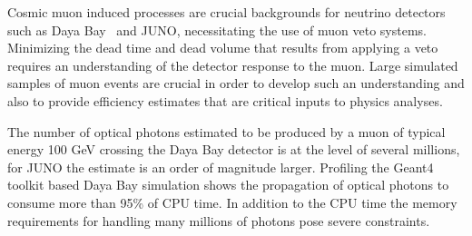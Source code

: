 \documentclass[a4paper]{jpconf}
\begin{document}

Cosmic muon induced processes are crucial backgrounds for neutrino
detectors such as Daya Bay~\cite{dyb} and JUNO\cite{juno}, 
necessitating the use of muon veto systems.
Minimizing the dead time and dead volume that results from applying 
a veto requires an understanding of the detector response to the muon.
Large simulated samples of muon events are crucial in order to 
develop such an understanding and also to provide efficiency estimates 
that are critical inputs to physics analyses.

The number of optical photons estimated to be produced by a muon of 
typical energy 100 GeV crossing the Daya Bay detector is at the level of several millions, 
for JUNO the estimate is an order of magnitude larger. 
Profiling the Geant4\cite{g4A}\cite{g4B}\cite{g4C} toolkit based Daya Bay simulation 
shows the propagation of optical photons to consume more than 95\% of CPU time. 
In addition to the CPU time the memory requirements for handling many millions 
of photons pose severe constraints.  

%
%
\end{document}
